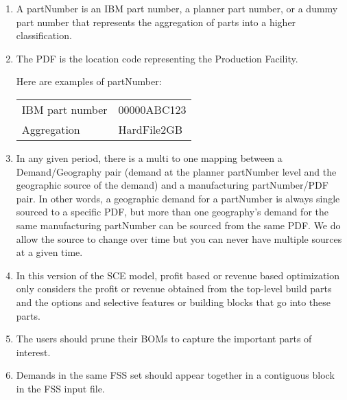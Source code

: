 \begin{enumerate}

\item A partNumber is an IBM part number, a planner part number, or a dummy part number that
represents the aggregation of parts into a higher classification.
\item The PDF is the location code representing the Production Facility.
   
Here are examples of partNumber:
\begin{center}
\begin{tabular}{ll}
  IBM part number  &   00000ABC123 \\
  Aggregation  &      HardFile2GB 
\end{tabular}
\end{center}

\item In any given period, there is a multi to one mapping between a
Demand/Geography pair (demand at the planner partNumber level and the
geographic source of the demand) and a manufacturing partNumber/PDF
pair.  In other words, a geographic demand for a partNumber is always
single sourced to a specific PDF, but more than one geography's demand
for the same manufacturing partNumber can be sourced from the same PDF.
We do allow the source to change
over time but you can never have multiple sources at a given time.

 
 
\item In this version of the SCE model, profit based or revenue based 
   optimization only considers the profit or revenue obtained from the
   top-level build parts and the options and selective features or building blocks
   that go into these parts.

\item The users should prune their BOMs to capture the important parts of
   interest.  

\item Demands in the same FSS set should appear together in a contiguous
   block in the FSS input file.
 
\end{enumerate}

